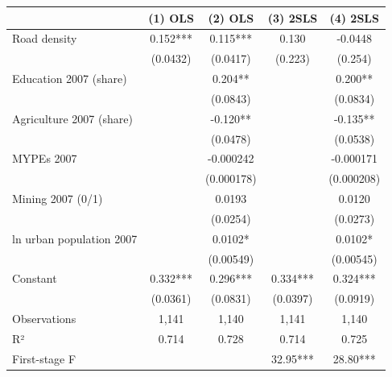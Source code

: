 \begin{tabular}{lcccc}
\hline
 & (1) OLS & (2) OLS & (3) 2SLS & (4) 2SLS \\
\hline
Road density & 0.152*** & 0.115*** & 0.130 & -0.0448 \\
 & (0.0432) & (0.0417) & (0.223) & (0.254) \\
Education 2007 (share) &  & 0.204** &  & 0.200** \\
 &  & (0.0843) &  & (0.0834) \\
Agriculture 2007 (share) &  & -0.120** &  & -0.135** \\
 &  & (0.0478) &  & (0.0538) \\
MYPEs 2007 &  & -0.000242 &  & -0.000171 \\
 &  & (0.000178) &  & (0.000208) \\
Mining 2007 (0/1) &  & 0.0193 &  & 0.0120 \\
 &  & (0.0254) &  & (0.0273) \\
ln urban population 2007 &  & 0.0102* &  & 0.0102* \\
 &  & (0.00549) &  & (0.00545) \\
Constant & 0.332*** & 0.296*** & 0.334*** & 0.324*** \\
 & (0.0361) & (0.0831) & (0.0397) & (0.0919) \\
Observations & 1,141 & 1,140 & 1,141 & 1,140 \\
R² & 0.714 & 0.728 & 0.714 & 0.725 \\
First-stage F &  &  & 32.95*** & 28.80*** \\
\hline
\end{tabular}
